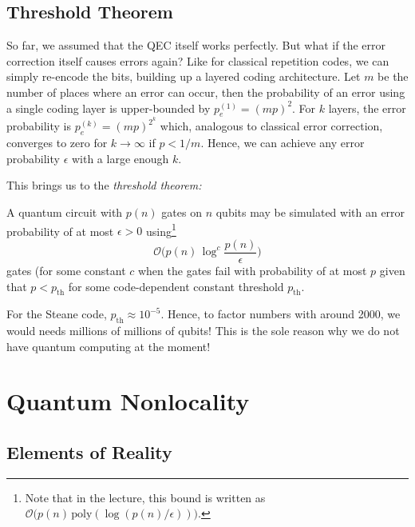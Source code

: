 	\section{Threshold Theorem}
		So far, we assumed that the \ac{QEC} itself works perfectly. But what if the error correction itself causes errors again? Like for classical repetition codes, we can simply re-encode the bits, building up a layered coding architecture. Let \(m\) be the number of places where an error can occur, then the probability of an error using a single coding layer is upper-bounded by \( p_e^{(1)} = (mp)^2 \). For \(k\) layers, the error probability is \( p_e^{(k)} = (mp)^{2^k} \) which, analogous to classical error correction, converges to zero for \(k \to \infty\) if \(p < 1/m\). Hence, we can achieve any error probability \(\epsilon\) with a large enough \(k\).

		This brings us to the \emph{threshold theorem:}
		\begin{theorem}
			A quantum circuit with \(p(n)\) gates on \(n\) qubits may be simulated with an error probability of at most \(\epsilon > 0\) using\footnote{Note that in the lecture, this bound is written as \( \mathcal{O}\bigl( p(n) \, \mathrm{poly}( \log(p(n)/\epsilon) ) \bigr) \).}
			\begin{equation}
				\mathcal{O}\Biggl( p(n) \, \log^c \frac{p(n)}{\epsilon} \Biggr)
			\end{equation}
			gates (for some constant \(c\) when the gates fail with probability of at most \(p\) given that \(p < p_\mathrm{th}\) for some code-dependent constant threshold \(p_\mathrm{th}\).
		\end{theorem}
		For the Steane code, \( p_\mathrm{th} \approx 10^{-5} \). Hence, to factor numbers with around \num{2000}, we would needs millions of millions of qubits! This is the sole reason why we do not have quantum computing at the moment!

\chapter{Quantum Nonlocality} %
	\label{c:nonlocality}



	\section{Elements of Reality} %

